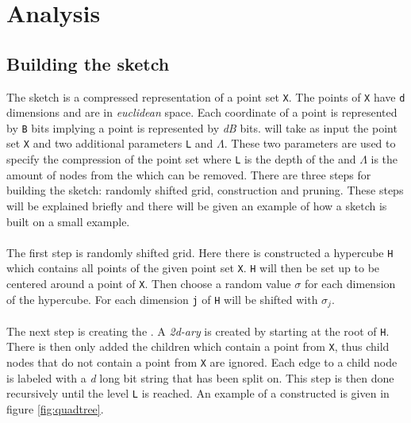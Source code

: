 \section{Analysis}
\label{analysis}

\subsection{Building the sketch}
The sketch is a compressed representation of a point set \texttt{X}. The points of \texttt{X} have \texttt{d} dimensions and are in \textit{euclidean} space. Each coordinate of a point is represented by \texttt{B} bits implying a point is represented by \textit{dB} bits. \qs{} will take as input the point set \texttt{X} and two additional parameters \texttt{L} and $\Lambda$. These two parameters are used to specify the compression of the point set where \texttt{L} is the depth of the \qt{} and $\Lambda$ is the amount of nodes from the \qt{} which can be removed. 
There are three steps for building the sketch: randomly shifted grid, \qt{} construction and pruning. These steps will be explained briefly and there will be given an example of how a sketch is built on a small example.
\\
\\
The first step is randomly shifted grid. Here there is constructed a hypercube \texttt{H} which contains all points of the given point set \texttt{X}. \texttt{H} will then be set up to be centered around a point of \texttt{X}. Then choose a random value $\sigma$ for each dimension of the hypercube. For each dimension \texttt{j} of \texttt{H} will be shifted with $\sigma_j$.
\\
\\
The next step is creating the \qt{}. A \textit{2d-ary} \qt{} is created by starting at the root of \texttt{H}. There is then only added the children which contain a point from \texttt{X}, thus child nodes that do not contain a point from \texttt{X} are ignored. Each edge to a child node is labeled with a \textit{d} long bit string that has been split on. This step is then done recursively until the level \texttt{L} is reached. An example of a constructed \qt{} is given in figure \ref{fig:quadtree}.

